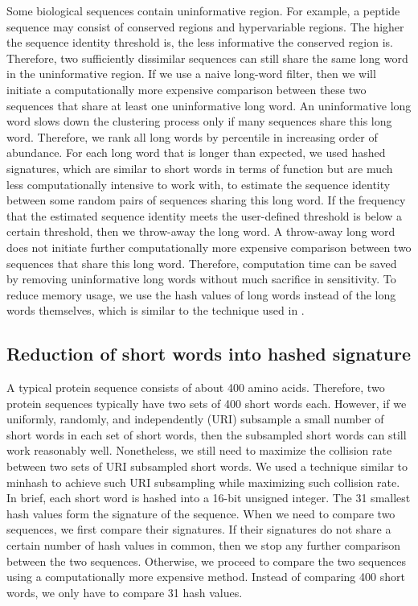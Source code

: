 \documentclass[]{article}
\begin{document}
Some biological sequences contain uninformative region.
For example, a peptide sequence may consist of conserved regions and hypervariable regions.
The higher the sequence identity threshold is, the less informative the conserved region is.
Therefore, two sufficiently dissimilar sequences can still share the same long word in the uninformative region.
If we use a naive long-word filter, then we will initiate a computationally more expensive comparison between these two sequences that share at least one uninformative long word.
An uninformative long word slows down the clustering process only if many sequences share this long word.
Therefore, we rank all long words by percentile in increasing order of abundance.
For each long word that is longer than expected, we used hashed signatures, which are similar to short words in terms of function but are much less computationally intensive to work with, to estimate the sequence identity between some random pairs of sequences sharing this long word.
If the frequency that the estimated sequence identity meets the user-defined threshold is below a certain threshold,
	then we throw-away the long word.
A throw-away long word does not initiate further computationally more expensive comparison between two sequences that share this long word.
Therefore, computation time can be saved by removing uninformative long words without much sacrifice in sensitivity.
To reduce memory usage, we use the hash values of long words instead of the long words themselves, which is similar to the technique used in \cite{steinegger2017linclust}.

\subsection{Reduction of short words into hashed signature}

A typical protein sequence consists of about 400 amino acids.
Therefore, two protein sequences typically have two sets of 400 short words each.
However, if we uniformly, randomly, and independently (URI) subsample a small number of short words in each set of short words, then the subsampled short words can still work reasonably well. 
Nonetheless, we still need to maximize the collision rate between two sets of URI subsampled short words.
We used a technique similar to minhash to achieve such URI subsampling while maximizing such collision rate.
In brief, each short word is hashed into a 16-bit unsigned integer.
The 31 smallest hash values form the signature of the sequence.
When we need to compare two sequences, we first compare their signatures.
If their signatures do not share a certain number of hash values in common, then we stop any further comparison between the two sequences. 
Otherwise, we proceed to compare the two sequences using a computationally more expensive method.
Instead of comparing 400 short words, we only have to compare 31 hash values.
\end{document}
